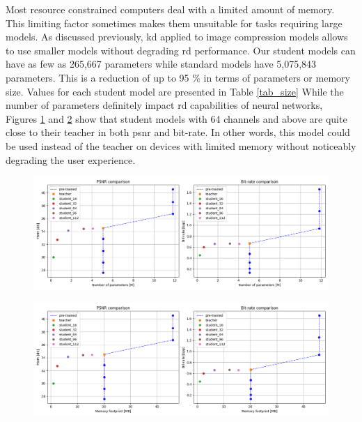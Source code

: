 Most resource constrained computers deal with a limited amount of memory. This limiting factor sometimes makes them unsuitable for tasks requiring large models. As discussed previously, \acrshort{kd} applied to image compression models allows to use smaller models without degrading \acrshort{rd} performance. Our student models can have as few as 265,667 parameters while standard models have 5,075,843 parameters. This is a reduction of up to 95 \% in terms of parameters or memory size. Values for each student model are presented in Table \ref{tab_size} While the number of parameters definitely impact \acrshort{rd} capabilities of neural networks, Figures \ref{kd_lic_parameters} and \ref{kd_lic_memory} show that student models with 64 channels and above are quite close to their teacher in both \acrshort{psnr} and bit-rate. In other words, this model could be used instead of the teacher on devices with limited memory without noticeably degrading the user experience.

\begin{figure}
    \centering
    \includegraphics[width=15cm]{img/kd_lic_parameters.png}
    \caption[]{}
    \label{kd_lic_parameters}
\end{figure}

\begin{figure}
    \centering
    \includegraphics[width=15cm]{img/kd_lic_memory.png}
    \caption[]{}
    \label{kd_lic_memory}
\end{figure}

